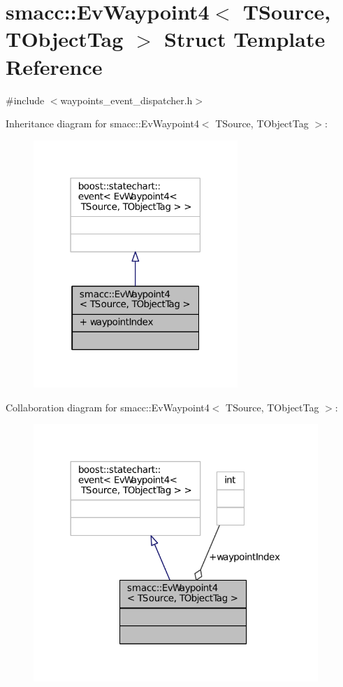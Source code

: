 \hypertarget{structsmacc_1_1EvWaypoint4}{}\section{smacc\+:\+:Ev\+Waypoint4$<$ T\+Source, T\+Object\+Tag $>$ Struct Template Reference}
\label{structsmacc_1_1EvWaypoint4}


{\ttfamily \#include $<$waypoints\+\_\+event\+\_\+dispatcher.\+h$>$}



Inheritance diagram for smacc\+:\+:Ev\+Waypoint4$<$ T\+Source, T\+Object\+Tag $>$\+:
\nopagebreak
\begin{figure}[H]
\begin{center}
\leavevmode
\includegraphics[width=219pt]{structsmacc_1_1EvWaypoint4__inherit__graph}
\end{center}
\end{figure}


Collaboration diagram for smacc\+:\+:Ev\+Waypoint4$<$ T\+Source, T\+Object\+Tag $>$\+:
\nopagebreak
\begin{figure}[H]
\begin{center}
\leavevmode
\includegraphics[width=305pt]{structsmacc_1_1EvWaypoint4__coll__graph}
\end{center}
\end{figure}
